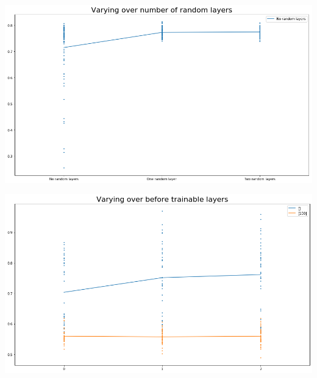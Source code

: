 \documentclass[]{article}
\newenvironment{Figure}
{\par\medskip\noindent\minipage{\linewidth}}
{\endminipage\par\medskip}
\begin{document}
\begin{multicols}{2}
	\begin{Figure}
		\centering
		\includegraphics[width=\linewidth]{average_classification}
		\label{fig:average_classification}
	\end{Figure}
	
	\begin{Figure}
		\centering
		\includegraphics[width=\linewidth]{average_regression}
		\label{fig:average_regression}
	\end{Figure}
	

\end{multicols}
\end{document}
